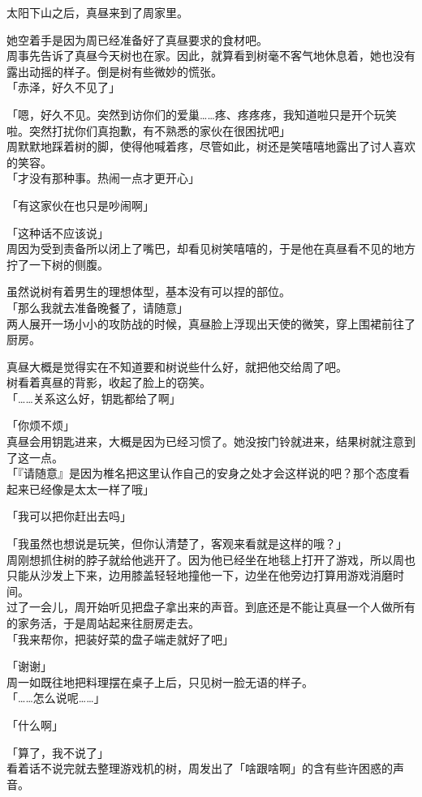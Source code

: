 \vspace{2\baselineskip}

太阳下山之后，真昼来到了周家里。

她空着手是因为周已经准备好了真昼要求的食材吧。\\

周事先告诉了真昼今天树也在家。因此，就算看到树毫不客气地休息着，她也没有露出动摇的样子。倒是树有些微妙的慌张。\\%

「赤泽，好久不见了」

「嗯，好久不见。突然到访你们的爱巢……疼、疼疼疼，我知道啦只是开个玩笑啦。突然打扰你们真抱歉，有不熟悉的家伙在很困扰吧」\\

周默默地踩着树的脚，使得他喊着疼，尽管如此，树还是笑嘻嘻地露出了讨人喜欢的笑容。\\

「才没有那种事。热闹一点才更开心」

「有这家伙在也只是吵闹啊」

「这种话不应该说」\\

周因为受到责备所以闭上了嘴巴，却看见树笑嘻嘻的，于是他在真昼看不见的地方拧了一下树的侧腹。

虽然说树有着男生的理想体型，基本没有可以捏的部位。\\

「那么我就去准备晚餐了，请随意」\\

两人展开一场小小的攻防战的时候，真昼脸上浮现出天使的微笑，穿上围裙前往了厨房。

真昼大概是觉得实在不知道要和树说些什么好，就把他交给周了吧。\\

树看着真昼的背影，收起了脸上的窃笑。\\

「……关系这么好，钥匙都给了啊」

「你烦不烦」\\

真昼会用钥匙进来，大概是因为已经习惯了。她没按门铃就进来，结果树就注意到了这一点。\\

「『请随意』是因为椎名把这里认作自己的安身之处才会这样说的吧？那个态度看起来已经像是太太一样了哦」

「我可以把你赶出去吗」

「我虽然也想说是玩笑，但你认清楚了，客观来看就是这样的哦？」\\

周刚想抓住树的脖子就给他逃开了。因为他已经坐在地毯上打开了游戏，所以周也只能从沙发上下来，边用膝盖轻轻地撞他一下，边坐在他旁边打算用游戏消磨时间。\\

过了一会儿，周开始听见把盘子拿出来的声音。到底还是不能让真昼一个人做所有的家务活，于是周站起来往厨房走去。\\

「我来帮你，把装好菜的盘子端走就好了吧」

「谢谢」\\

周一如既往地把料理摆在桌子上后，只见树一脸无语的样子。\\

「……怎么说呢……」

「什么啊」

「算了，我不说了」\\

看着话不说完就去整理游戏机的树，周发出了「啥跟啥啊」的含有些许困惑的声音。
